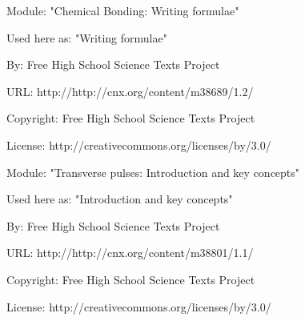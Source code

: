       \par\vspace{9pt}\noindent\begin{minipage}{\textwidth}
      Module: "Chemical Bonding: Writing formulae" \par\nopagebreak\noindent
      Used here as: "Writing formulae" \par\nopagebreak\noindent
        By: Free High School Science Texts Project\par\nopagebreak\noindent
      URL: http://http://cnx.org/content/m38689/1.2/\par\nopagebreak\noindent
      \par\nopagebreak\noindent
      Copyright: Free High School Science Texts Project\par\nopagebreak\noindent
      License:  http://creativecommons.org/licenses/by/3.0/\par\nopagebreak\noindent
      \par\end{minipage}
      \par\vspace{9pt}\noindent\begin{minipage}{\textwidth}
      Module: "Transverse pulses: Introduction and key concepts" \par\nopagebreak\noindent
      Used here as: "Introduction and key concepts" \par\nopagebreak\noindent
        By: Free High School Science Texts Project\par\nopagebreak\noindent
      URL: http://http://cnx.org/content/m38801/1.1/\par\nopagebreak\noindent
      \par\nopagebreak\noindent
      Copyright: Free High School Science Texts Project\par\nopagebreak\noindent
      License:  http://creativecommons.org/licenses/by/3.0/\par\nopagebreak\noindent
      \par\end{minipage}
